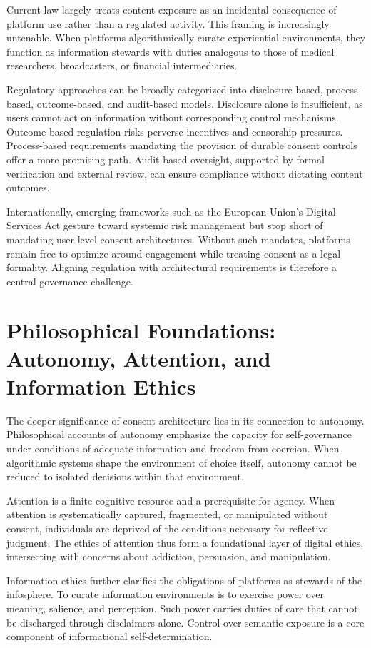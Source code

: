 \documentclass[11pt,oneside]{article}
\begin{document}
Current law largely treats content exposure as an incidental consequence of platform use rather than a regulated activity. This framing is increasingly untenable. When platforms algorithmically curate experiential environments, they function as information stewards with duties analogous to those of medical researchers, broadcasters, or financial intermediaries.

Regulatory approaches can be broadly categorized into disclosure-based, process-based, outcome-based, and audit-based models. Disclosure alone is insufficient, as users cannot act on information without corresponding control mechanisms. Outcome-based regulation risks perverse incentives and censorship pressures. Process-based requirements mandating the provision of durable consent controls offer a more promising path. Audit-based oversight, supported by formal verification and external review, can ensure compliance without dictating content outcomes.

Internationally, emerging frameworks such as the European Union’s Digital Services Act gesture toward systemic risk management but stop short of mandating user-level consent architectures. Without such mandates, platforms remain free to optimize around engagement while treating consent as a legal formality. Aligning regulation with architectural requirements is therefore a central governance challenge.

\section{Philosophical Foundations: Autonomy, Attention, and Information Ethics}

The deeper significance of consent architecture lies in its connection to autonomy. Philosophical accounts of autonomy emphasize the capacity for self-governance under conditions of adequate information and freedom from coercion. When algorithmic systems shape the environment of choice itself, autonomy cannot be reduced to isolated decisions within that environment.

Attention is a finite cognitive resource and a prerequisite for agency. When attention is systematically captured, fragmented, or manipulated without consent, individuals are deprived of the conditions necessary for reflective judgment. The ethics of attention thus form a foundational layer of digital ethics, intersecting with concerns about addiction, persuasion, and manipulation.

Information ethics further clarifies the obligations of platforms as stewards of the infosphere. To curate information environments is to exercise power over meaning, salience, and perception. Such power carries duties of care that cannot be discharged through disclaimers alone. Control over semantic exposure is a core component of informational self-determination.
\end{document}
